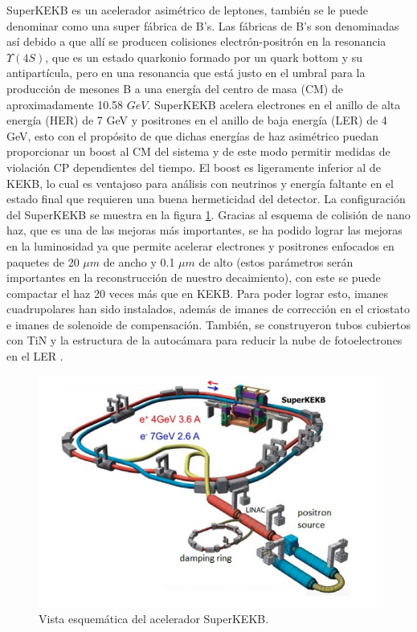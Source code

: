 SuperKEKB es un acelerador asimétrico de leptones, también se le puede denominar como una super fábrica de B's. Las fábricas de B's son denominadas así debido a que allí se producen colisiones electrón-positrón en la resonancia \(\Upsilon(4S)\), que es un estado quarkonio formado por un quark bottom y su antipartícula, pero en una resonancia que está justo en el umbral para la producción de mesones B a una energía del centro de masa (CM) de aproximadamente 10.58 \(GeV\). SuperKEKB acelera electrones en el anillo de alta energía (HER) de 7 GeV y positrones en el anillo de baja energía (LER) de 4 GeV, esto con el propósito de que dichas energías de haz asimétrico puedan proporcionar un boost al CM del sistema y de este modo permitir medidas de violación CP dependientes del tiempo. El boost es ligeramente inferior al de KEKB, lo cual es ventajoso para análisis con neutrinos y energía faltante en el estado final que requieren una buena hermeticidad del detector. La configuración del SuperKEKB se muestra en la figura  \ref{fig:superkekb}. Gracias al esquema de colisión de nano haz, que es una de las mejoras más importantes, se ha podido lograr las mejoras en la luminosidad ya que permite acelerar electrones y positrones enfocados en paquetes de 20 \(\mu m\) de ancho y 0.1 \(\mu m\) de alto (estos parámetros serán importantes en la reconstrucción de nuestro decaimiento), con este se puede compactar el haz 20 veces más que en KEKB. Para poder lograr esto, imanes cuadrupolares han sido instalados, además de imanes de corrección en el criostato e imanes de solenoide de compensación. También, se construyeron tubos cubiertos con TiN y la estructura de la autocámara para reducir la nube de fotoelectrones en el LER \cite{universe4100101}.
\begin{figure}[h]
    \centering
    \includegraphics[scale=.5]{Images/superkekb.png}
    \caption{\small Vista esquemática del acelerador SuperKEKB.}
    \label{fig:superkekb}
\end{figure}

